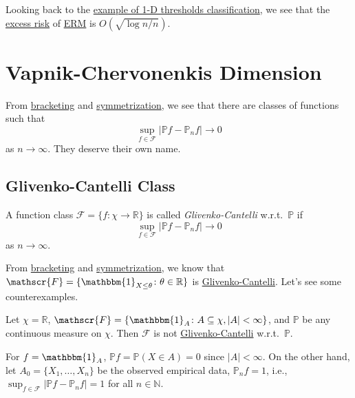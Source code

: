 \begin{remark}
	Looking back to the \hyperref[eg:1D-classification-thresholds]{example of 1-D thresholds classification}, we see that the \hyperref[not:excess-risk]{excess risk} of \hyperref[prb:ERM]{ERM} is \(O(\sqrt{\log n / n} )\).
\end{remark}

\section{Vapnik-Chervonenkis Dimension}
From \hyperref[prop:bracketing]{bracketing} and \hyperref[prop:symmetrization]{symmetrization}, we see that there are classes of functions such that
\[
	\sup _{f\in \mathscr{F} } \left\vert \mathbb{P} f - \mathbb{P} _n f \right\vert \to 0
\]
as \(n \to \infty \). They deserve their own name.

\subsection{Glivenko-Cantelli Class}
\begin{definition}\label{def:Glivenko-Cantelli}
	A function class \(\mathscr{F} = \{ f\colon \chi \to \mathbb{R} \} \) is called \emph{Glivenko-Cantelli} w.r.t.\ \(\mathbb{P} \) if
	\[
		\sup _{f\in \mathscr{F} } \left\vert \mathbb{P} f - \mathbb{P} _n f \right\vert \to 0
	\]
	as \(n \to \infty \).
\end{definition}

From \hyperref[prop:bracketing]{bracketing} and \hyperref[prop:symmetrization]{symmetrization}, we know that \(\mathscr{F} = \{ \mathbbm{1}_{X \leq \theta } \colon \theta \in \mathbb{R} \} \) is \hyperref[def:Glivenko-Cantelli]{Glivenko-Cantelli}. Let's see some counterexamples.

\begin{eg}
	Let \(\chi = \mathbb{R} \), \(\mathscr{F} = \{ \mathbbm{1}_{A} \colon A \subseteq \chi, \vert A \vert < \infty \} \), and \(\mathbb{P} \) be any continuous measure on \(\chi \). Then \(\mathscr{F} \) is not \hyperref[def:Glivenko-Cantelli]{Glivenko-Cantelli} w.r.t.\ \(\mathbb{P} \).
\end{eg}
\begin{explanation}
	For \(f = \mathbbm{1}_{A} \), \(\mathbb{P} f = \mathbb{P} (X\in A) = 0\) since \(\vert A \vert < \infty \). On the other hand, let \(A_0 = \{ X_1, \dots , X_n \} \) be the observed empirical data, \(\mathbb{P} _n f = 1\), i.e., \(\sup _{f\in \mathscr{F} } \vert \mathbb{P} f - \mathbb{P} _n f \vert = 1\) for all \(n\in \mathbb{N} \).
\end{explanation}

